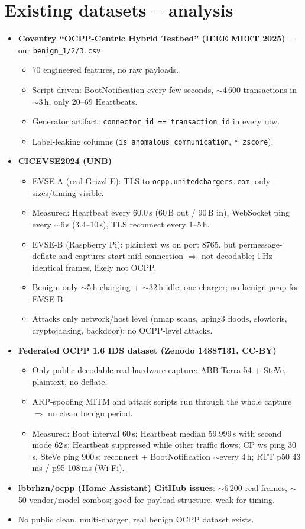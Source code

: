 \documentclass[11pt]{article}
\begin{document}
\section{Existing datasets -- analysis}
\begin{itemize}
  \item \textbf{Coventry ``OCPP-Centric Hybrid Testbed'' (IEEE MEET 2025)} = our \texttt{benign\_1/2/3.csv}
  \begin{itemize}
    \item 70 engineered features, no raw payloads.
    \item Script-driven: BootNotification every few seconds, $\sim$4\,600 transactions in $\sim$3\,h, only 20--69 Heartbeats.
    \item Generator artifact: \texttt{connector\_id == transaction\_id} in every row.
    \item Label-leaking columns (\texttt{is\_anomalous\_communication}, \texttt{*\_zscore}).
  \end{itemize}
  \item \textbf{CICEVSE2024 (UNB)}
  \begin{itemize}
    \item EVSE-A (real Grizzl-E): TLS to \texttt{ocpp.unitedchargers.com}; only sizes/timing visible.
    \item Measured: Heartbeat every 60.0\,s (60\,B out / 90\,B in), WebSocket ping every $\sim$6\,s (3.4--10\,s), TLS reconnect every 1--5\,h.
    \item EVSE-B (Raspberry Pi): plaintext ws on port 8765, but permessage-deflate and captures start mid-connection $\Rightarrow$ not decodable; 1\,Hz identical frames, likely not OCPP.
    \item Benign: only $\sim$5\,h charging + $\sim$32\,h idle, one charger; no benign pcap for EVSE-B.
    \item Attacks only network/host level (nmap scans, hping3 floods, slowloris, cryptojacking, backdoor); no OCPP-level attacks.
  \end{itemize}
  \item \textbf{Federated OCPP 1.6 IDS dataset (Zenodo 14887131, CC-BY)}
  \begin{itemize}
    \item Only public decodable real-hardware capture: ABB Terra 54 + SteVe, plaintext, no deflate.
    \item ARP-spoofing MITM and attack scripts run through the whole capture $\Rightarrow$ no clean benign period.
    \item Measured: Boot interval 60\,s; Heartbeat median 59.999\,s with second mode 62\,s; Heartbeat suppressed while other traffic flows; CP ws ping 30\,s, SteVe ping 900\,s; reconnect + BootNotification $\sim$every 4\,h; RTT p50 43\,ms / p95 108\,ms (Wi-Fi).
  \end{itemize}
  \item \textbf{lbbrhzn/ocpp (Home Assistant) GitHub issues}: $\sim$6\,200 real frames, $\sim$50 vendor/model combos; good for payload structure, weak for timing.
  \item No public clean, multi-charger, real benign OCPP dataset exists.
\end{itemize}
\end{document}
